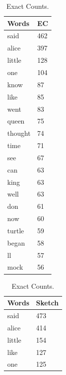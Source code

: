 \documentclass[shortpaper]{revdetua}
\begin{document}
\begin{table}[!htb]
    \begin{subtable}{.5\linewidth}
        \centering
        \begin{tabular}{|l|l|}
            \hline
            Words     & EC \\ \hline
            said    & 462 \\ \hline
            alice   & 397 \\ \hline
            little  & 128 \\ \hline
            one     & 104 \\ \hline
            know    & 87  \\ \hline
            like    & 85  \\ \hline
            went    & 83  \\ \hline
            queen   & 75  \\ \hline
            thought & 74  \\ \hline
            time    & 71  \\ \hline
            see     & 67  \\ \hline
            can     & 63  \\ \hline
            king    & 63  \\ \hline
            well    & 63  \\ \hline
            don     & 61  \\ \hline
            now     & 60  \\ \hline
            turtle  & 59  \\ \hline
            began   & 58  \\ \hline
            ll      & 57  \\ \hline
            mock    & 56  \\ \hline
        \end{tabular}
        \caption{Exact Counts.}
    \end{subtable}%
    \begin{subtable}{.5\linewidth}
        \centering 
        \begin{tabular}{|l|l|}
            \hline
            Words     & Sketch \\ \hline
            said    & 473    \\ \hline
            alice   & 414    \\ \hline
            little  & 154    \\ \hline
            like    & 127    \\ \hline
            one     & 125    \\ \hline

\end{tabular}
\end{subtable}
\end{table}
\end{document}
